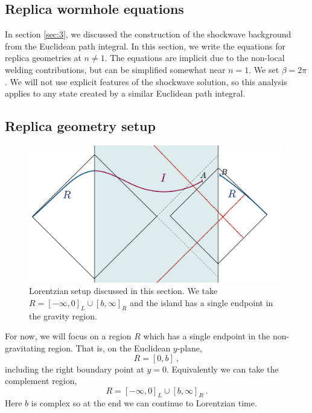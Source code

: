 \documentclass[11pt,oneside,letterpaper]{article}
\newcommand{\be}{\begin{equation}}
\newcommand{\ee}{\end{equation}}
\def\be{\begin{eqnarray}}
\def\ee{\end{eqnarray}}
\def\be{\begin{equation}}
\def\ee{\end{equation}}
\numberwithin{equation}{section}
\def\be{\begin{equation}}
\def\ee{\end{equation}}
\def \be {\begin{equation}}
\def \ee {\end{equation}}
\begin{document}
\begin{spacing}{1.1}
 



\section{Replica wormhole equations}\label{sec:repworm}



\newcommand{\M}{\mathcal{M}}

In section \ref{sec:3}, we discussed the construction of the shockwave background from the Euclidean path integral. In this section, we write the equations for replica geometries at $n\neq 1$. The equations are implicit due to the non-local welding contributions, but can be simplified somewhat near $n=1$. We set $\beta = 2\pi$. We will not use explicit features of the shockwave solution, so this analysis applies to any state created by a similar Euclidean path integral.



\subsection{Replica geometry setup}
\begin{figure}
   \begin{center}
  \includegraphics[height=6cm]{figures/Lorentzian_singleinterval.png}
  \caption{Lorentzian setup discussed in this section. We take $R=[-\infty,0 ]_L\cup [b,\infty]_R$ and the island has a single endpoint in the gravity region.
  \label{fig:Lorentzian_singleinterval}
  }
  \end{center}
\end{figure}
For now, we will focus on a region $R$ which has a single endpoint in the non-gravitating region. That is, on the Euclidean $y$-plane, 
\be
R = [0,b] \ ,
\ee
including the right boundary point at $y=0$. Equivalently we can take the complement region,
\be
R=[-\infty,0 ]_L\cup [b,\infty]_R \ .
\ee
Here $b$ is complex so at the end we can continue to Lorentzian time. 


\end{spacing}
\end{document}
